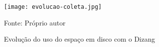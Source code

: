 
\begin{figure}[htb!]
\footnotesize
\caption{Evolução do uso do espaço em disco com o Dizang}
\texttt{[image: evolucao-coleta.jpg]}
\centering
\label{fig:evolucao-coleta}
\begin{center}
Fonte: Próprio autor 
\end{center}
\end{figure}


\begin{comment}
A Fig. \ref{fig:memoria_salva}, por sua vez, mostra uma listagem de alguns dos instantâneos de memória salvos pela solução depois que os contêineres são removidos. 
%
Nela pode-se ver que as coletas continuaram no disco da máquina mesmo após a remoção dos contêineres. 
%
Usando o identificador do contêiner e da imagem, consegue-se associar a evidência a sua origem (i.e., a imagem e o contêiner), conforme esperado para uma análise forense.
%
Essa capacidade se mantém após a detecção de uma ameaça, pois nesse caso coletas mais antigas deixam de ser apagadas.
%
Assim, é possível descrever o estado do sistema antes e depois do incidente \cite{Case_Memory_Forensics:2014}, permitindo-se, por exemplo, que ataques de injeção de código em memória sejam analisados.


\begin{figure*}[htb!]
\footnotesize
\caption{Exemplo de lista de instantâneos de memória.}
\fbox{
\texttt{[image: memoria\_salva.jpg]}
}
\centering
\label{fig:memoria_salva}
\end{figure*}

\end{comment}

